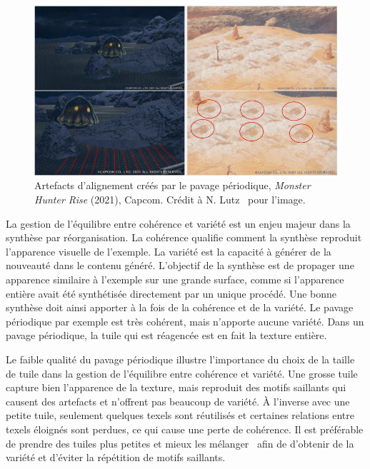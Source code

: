 \begin{figure}
    \centering
    \includegraphics[width=\textwidth]{contenu/resources/images/periodic_tiling}
    \caption[Artefacts d'alignement créés par le pavage périodique]{Artefacts d'alignement créés par le pavage périodique, \textit{Monster Hunter Rise} (2021), Capcom. Crédit à N. Lutz~\cite{lutz_processus_2021} pour l'image.}
    \label{fig:periodic-tiling}
\end{figure}

La gestion de l'équilibre entre cohérence et variété est un enjeu majeur dans la synthèse par réorganisation. La cohérence qualifie comment la synthèse reproduit l'apparence visuelle de l'exemple. La variété est la capacité à générer de la nouveauté dans le contenu généré. L'objectif de la synthèse est de propager une apparence similaire à l'exemple sur une grande surface, comme si l'apparence entière avait été synthétisée directement par un unique procédé. Une bonne synthèse doit ainsi apporter à la fois de la cohérence et de la variété. Le pavage périodique par exemple est très cohérent, mais n'apporte aucune variété. Dans un pavage périodique, la tuile qui est réagencée est en fait la texture entière.

\bigskip

Le faible qualité du pavage périodique illustre l'importance du choix de la taille de tuile dans la gestion de l'équilibre entre cohérence et variété. Une grosse tuile capture bien l'apparence de la texture, mais reproduit des motifs saillants qui causent des artefacts et n'offrent pas beaucoup de variété. À l'inverse avec une petite tuile, seulement quelques texels sont réutilisés et certaines relations entre texels éloignés sont perdues, ce qui cause une perte de cohérence. Il est préférable de prendre des tuiles plus petites et mieux les mélanger~\cite{heitz_high-performance_2018} afin de d'obtenir de la variété et d'éviter la répétition de motifs saillants.


